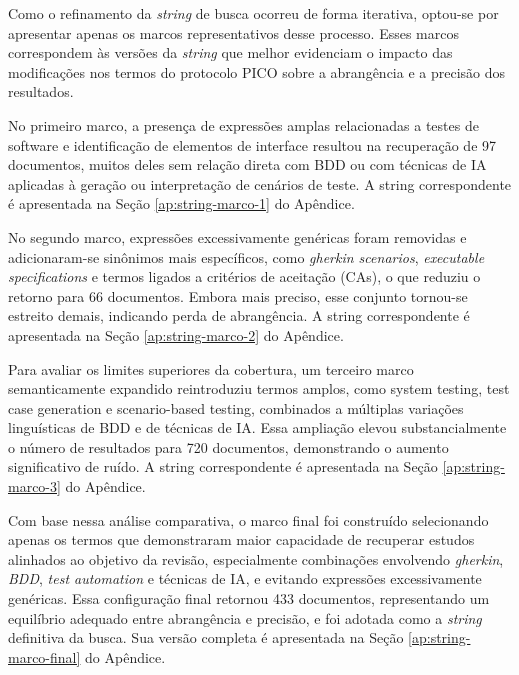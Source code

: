 Como o refinamento da \textit{string} de busca ocorreu de forma iterativa, optou-se por apresentar apenas os marcos representativos desse processo. Esses marcos correspondem às versões da \textit{string} que melhor evidenciam o impacto das modificações nos termos do protocolo PICO sobre a abrangência e a precisão dos resultados.

No primeiro marco, a presença de expressões amplas relacionadas a testes de software e identificação de elementos de interface resultou na recuperação de 97 documentos, muitos deles sem relação direta com BDD ou com técnicas de IA aplicadas à geração ou interpretação de cenários de teste. A string correspondente é apresentada na Seção \ref{ap:string-marco-1} do Apêndice.

No segundo marco, expressões excessivamente genéricas foram removidas e adicionaram-se sinônimos mais específicos, como \textit{gherkin scenarios}, \textit{executable specifications} e termos ligados a critérios de aceitação (CAs), o que reduziu o retorno para 66 documentos. Embora mais preciso, esse conjunto tornou-se estreito demais, indicando perda de abrangência. A string correspondente é apresentada na Seção \ref{ap:string-marco-2} do Apêndice.

Para avaliar os limites superiores da cobertura, um terceiro marco semanticamente expandido reintroduziu termos amplos, como system testing, test case generation e scenario-based testing, combinados a múltiplas variações linguísticas de BDD e de técnicas de IA. Essa ampliação elevou substancialmente o número de resultados para 720 documentos, demonstrando o aumento significativo de ruído. A string correspondente é apresentada na Seção \ref{ap:string-marco-3} do Apêndice.

Com base nessa análise comparativa, o marco final foi construído selecionando apenas os termos que demonstraram maior capacidade de recuperar estudos alinhados ao objetivo da revisão, especialmente combinações envolvendo \textit{gherkin}, \textit{BDD}, \textit{test automation} e técnicas de IA, e evitando expressões excessivamente genéricas. Essa configuração final retornou 433 documentos, representando um equilíbrio adequado entre abrangência e precisão, e foi adotada como a \textit{string} definitiva da busca. Sua versão completa é apresentada na Seção \ref{ap:string-marco-final} do Apêndice.
